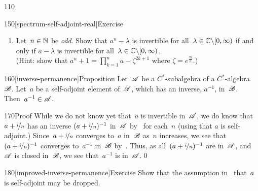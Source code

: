 \begin{parsec}{110}
\begin{point}{150}[spectrum-self-adjoint-real]{Exercise}
\begin{enumerate}
Conclude that $a^n-\lambda$ is invertible for all 
$\lambda\in\C\backslash[0,\infty)$ and \emph{even} $n\in\N$.
\item
Let~$n\in \N$ be \emph{odd}.
Show that $a^n-\lambda$ is invertible
for all~$\lambda\in \C\backslash[0,\infty)$
if and only if $a-\lambda$ is invertible
for all~$\lambda\in \C\backslash[0,\infty)$.\\
(Hint: show that
$a^n+1= \prod_{k=1}^n a-\zeta^{2k+1}$
where $\zeta=e^{\frac{\pi i}{n}}$.)
\end{enumerate}%
\spacingfix{}
\end{point}%
\begin{point}{160}[inverse-permanence]{Proposition}%
Let~$\mathscr{A}$ be a $C^*$-subalgebra
of a $C^*$-algebra $\mathscr{B}$.
Let~$a$ be a self-adjoint element of~$\mathscr{A}$,
which has an inverse, $a^{-1}$, in~$\mathscr{B}$.
Then~$a^{-1}\in\mathscr{A}$.
\begin{point}{170}{Proof}%
While we do not know yet that~$a$ is invertible in~$\mathscr{A}$,
we do know that~$a+\nicefrac{i}{n}$ 
has an inverse $(a+\nicefrac{i}{n})^{-1}$ in~$\mathscr{A}$
by~
for each~$n$
(using that $a$ is self-adjoint.)
Since~$a+\nicefrac{i}{n}$ converges to~$a$ in~$\mathscr{B}$ as~$n$ increases,
we see that $(a+\nicefrac{i}{n})^{-1}$ converges to~$a^{-1}$
in~$\mathscr{B}$ by~.
Thus, as all~$(a+\nicefrac{i}{n})^{-1}$ are in~$\mathscr{A}$,
and~$\mathscr{A}$ is closed in~$\mathscr{B}$,
we see that~$a^{-1}$ is in~$\mathscr{A}$.\qed
\end{point}
\end{point}
\begin{point}{180}[improved-inverse-permanence]{Exercise}%
	Show that the assumption in~ 
	that~$a$ is self-adjoint
may be dropped. 


\end{point}
\end{parsec}
